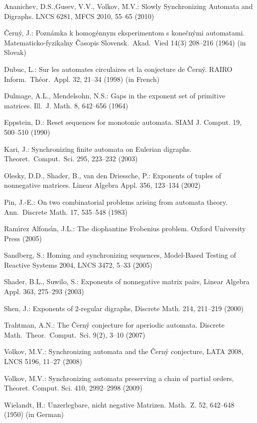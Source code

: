 \documentclass[11pt]{llncs}
\begin{document}
\begin{thebibliography}{99}

Ananichev, D.S.,Gusev, V.V., Volkov, M.V.: Slowly Synchronizing Automata and Digraphs.
LNCS 6281, MFCS 2010, 55--65 (2010)


\v{C}ern\'{y}, J.: Pozn\'{a}mka k homog\'{e}nnym eksperimentom s
kone\v{c}n\'{y}mi automatami. Matematicko-fyzikalny \v{C}asopis
Slovensk.\ Akad.\ Vied 14(3) 208--216 (1964) (in Slovak)

Dubuc, L.: Sur les automates circulaires et la conjecture de
\v{C}ern\'y. RAIRO Inform.\ Th\'eor.\ Appl. 32, 21--34 (1998) (in
French)


Dulmage, A.L., Mendelsohn, N.S.: Gaps in the exponent set of primitive
matrices. Ill.\ J. Math. 8, 642--656 (1964)

Eppstein, D.: Reset sequences for monotonic automata. SIAM J.
Comput. 19, 500--510 (1990)


Kari, J.: Synchronizing finite automata on Eulerian digraphs.
Theoret.\ Comput.\ Sci. 295, 223--232 (2003)

Olesky, D.D., Shader, B., van den Driessche, P.: Exponents of tuples of nonnegative matrices. Linear Algebra Appl. 356, 
123--134 (2002)

Pin, J.-E.: On two combinatorial problems arising from automata
theory. Ann.\ Discrete Math. 17, 535--548 (1983)

Ram\'{\i}rez Alfons\'{\i}n, J.L.: The diophantine Frobenius problem.
Oxford University Press (2005)

Sandberg, S.: Homing and synchronizing sequences, Model-Based Testing of Reactive Systems 2004, LNCS 3472, 5--33 (2005)

Shader, B.L., Suwilo, S.: Exponents of nonnegative matrix pairs, Linear Algebra Appl. 363, 275--293 (2003)


Shen, J.: Exponents of 2-regular digraphs, Discrete Math. 214, 211--219 (2000)

Trahtman, A.N.: The \v{C}ern\'y conjecture for aperiodic automata. Discrete
Math.\ Theor.\ Comput.\ Sci. 9(2), 3--10 (2007)

Volkov, M.V.: Synchronizing automata and the \v{C}ern\'{y}
conjecture, LATA 2008, LNCS 5196, 11--27 (2008)

Volkov, M.V.: Synchronizing automata preserving a chain of partial
orders, Theoret. Comput. Sci. 410, 2992--2998 (2009)

Wielandt, H.: Unzerlegbare, nicht negative Matrizen. Math.\ Z.
52, 642--648 (1950) (in German)
\end{thebibliography}
\end{document}
